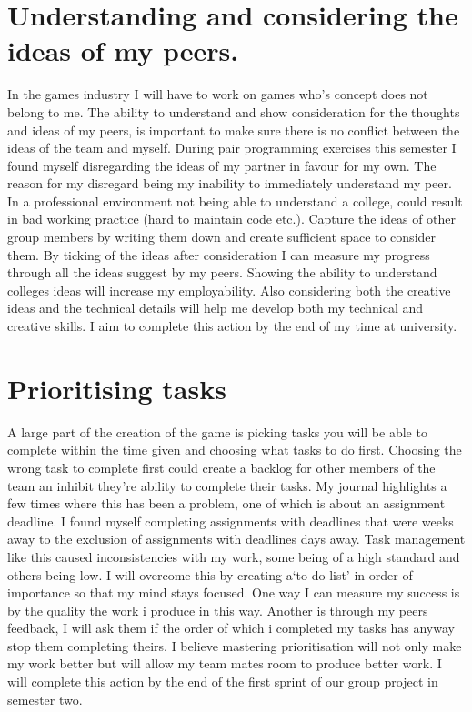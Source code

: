 \documentclass{scrartcl}
\begin{document}
\section{Understanding and considering the ideas of my peers.}
In the games industry I will have to work on games who's  concept does not belong to me. The ability to understand and show consideration for the thoughts and ideas of my peers, is important to make sure there is no conflict between the ideas of the team and myself. During pair programming exercises this semester I found myself disregarding the ideas of my partner in favour for my own. The reason for my disregard being my inability to immediately understand my peer. In a professional environment not being able to understand a college, could result in bad working practice (hard to maintain code etc.). Capture the ideas of other group members by writing them down and create sufficient space to consider them. By ticking of the ideas after consideration I can measure my progress through all the ideas suggest by my peers. Showing the ability to understand colleges ideas will increase my employability. Also considering both the creative ideas and the technical details will help me develop both my technical and creative skills. I aim to complete this action by the end of my time at university. 

\section{Prioritising tasks}
A large part of the creation of the game is picking tasks you will be able to complete within the time given and choosing what tasks to do first. Choosing the wrong task to complete first could create a backlog for other members of the team an inhibit they're ability to complete their tasks. My journal highlights a few times where this has been a problem, one of which is about an assignment deadline. I found myself completing assignments with deadlines that were weeks away to the exclusion of assignments with deadlines days away. Task management like this caused inconsistencies with my work, some being of a high standard and others being low. I will overcome this by creating a`to do list' in order of importance so that my mind stays focused. One way I can measure my success is by the quality the work i produce in this way. Another is through my peers feedback, I will ask them if the order of which i completed my tasks has anyway stop them completing theirs. I believe mastering prioritisation will not only make my work better but will allow my team mates room to produce better work. I will complete this action by the end of the first sprint of our group project in semester two.
\end{document}

